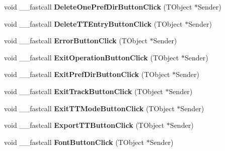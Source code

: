 \begin{DoxyCompactItemize}
\item 
\mbox{\label{class_t_interface_a3136530959237eaa57486f4f48357855}} 
void \+\_\+\+\_\+fastcall {\bfseries Delete\+One\+Pref\+Dir\+Button\+Click} (T\+Object $\ast$Sender)
\item 
\mbox{\label{class_t_interface_abdd4a70649a10a29c9a069d040072808}} 
void \+\_\+\+\_\+fastcall {\bfseries Delete\+T\+T\+Entry\+Button\+Click} (T\+Object $\ast$Sender)
\item 
\mbox{\label{class_t_interface_adec6eee7e3b3314673198431c4b1f777}} 
void \+\_\+\+\_\+fastcall {\bfseries Error\+Button\+Click} (T\+Object $\ast$Sender)
\item 
\mbox{\label{class_t_interface_a3e59d6f1f39ffe34a9d6e7bf930acbff}} 
void \+\_\+\+\_\+fastcall {\bfseries Exit\+Operation\+Button\+Click} (T\+Object $\ast$Sender)
\item 
\mbox{\label{class_t_interface_ab2a25d27dcbae558b8f9a4ac62937523}} 
void \+\_\+\+\_\+fastcall {\bfseries Exit\+Pref\+Dir\+Button\+Click} (T\+Object $\ast$Sender)
\item 
\mbox{\label{class_t_interface_ad0fa9f32b059b346e066ab23d62a4bfc}} 
void \+\_\+\+\_\+fastcall {\bfseries Exit\+Track\+Button\+Click} (T\+Object $\ast$Sender)
\item 
\mbox{\label{class_t_interface_aa78089df3d8323be6fde98c0ee48424c}} 
void \+\_\+\+\_\+fastcall {\bfseries Exit\+T\+T\+Mode\+Button\+Click} (T\+Object $\ast$Sender)
\item 
\mbox{\label{class_t_interface_ab7c52bd31930036c95b9b71c2f1f0426}} 
void \+\_\+\+\_\+fastcall {\bfseries Export\+T\+T\+Button\+Click} (T\+Object $\ast$Sender)
\item 
\mbox{\label{class_t_interface_a167410ef8c1ebe53abd0afee71943ecf}} 
void \+\_\+\+\_\+fastcall {\bfseries Font\+Button\+Click} (T\+Object $\ast$Sender)
\item 
\mbox{\label{class_t_interface_a19e64ee6952b0fd3c260eb05c14a34c8}} 

\end{DoxyCompactItemize}
